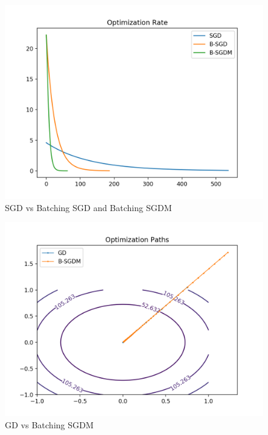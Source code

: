 \documentclass[twoside,11pt]{homework}
\DeclarePairedDelimiter{\2norm}{\lVert}{\rVert^2_2}
\newcommand{\1}[1]{\mathds{1}\left[#1\right]}
\begin{document}
\begin{enumerate}[\bf (i)]
\begin{enumerate}
       \begin{figure}[h!]
         \centering
         \includegraphics[width=6in]{img/batch3.png}
         \caption{SGD vs Batching SGD and Batching SGDM}
         \label{fig:sgdm3}
       \end{figure}

         \begin{figure}[h!]
         \centering
         \includegraphics[width=6in]{img/gd-batch.png}
         \caption{GD vs Batching SGDM}
         \label{fig:sgdm}
       \end{figure}


\end{enumerate}
\end{enumerate}
\end{document}
